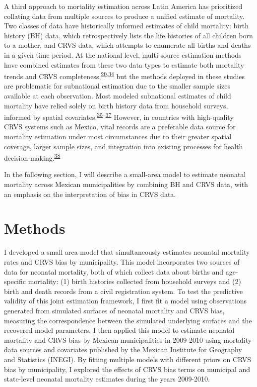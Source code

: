 \documentclass[
]{article}
\begin{document}
A third approach to mortality estimation across Latin America has prioritized collating data from multiple sources to produce a unified estimate of mortality. Two classes of data have historically informed estimates of child mortality: birth history (BH) data, which retrospectively lists the life histories of all children born to a mother, and CRVS data, which attempts to enumerate all births and deaths in a given time period. At the national level, multi-source estimation methods have combined estimates from these two data types to estimate both mortality trends and CRVS completeness,\textsuperscript{\protect\hyperlink{ref-Dicker2018}{20},\protect\hyperlink{ref-Fisker2019}{34}} but the methods deployed in these studies are problematic for subnational estimation due to the smaller sample sizes available at each observation. Most modeled subnational estimates of child mortality have relied solely on birth history data from household surveys, informed by spatial covariates.\textsuperscript{\protect\hyperlink{ref-Golding2017}{35}--\protect\hyperlink{ref-Wakefield2019}{37}} However, in countries with high-quality CRVS systems such as Mexico, vital records are a preferable data source for mortality estimation under most circumstances due to their greater spatial coverage, larger sample sizes, and integration into existing processes for health decision-making.\textsuperscript{\protect\hyperlink{ref-UnitedNationsStatisticsDivision2014}{38}}

In the following section, I will describe a small-area model to estimate neonatal mortality across Mexican municipalities by combining BH and CRVS data, with an emphasis on the interpretation of bias in CRVS data.

\hypertarget{methods}{%
\section{Methods}\label{methods}}

I developed a small area model that simultaneously estimates neonatal mortality rates and CRVS bias by municipality. This model incorporates two sources of data for neonatal mortality, both of which collect data about births and age-specific mortality: (1) birth histories collected from household surveys and (2) birth and death records from a civil registration system. To test the predictive validity of this joint estimation framework, I first fit a model using observations generated from simulated surfaces of neonatal mortality and CRVS bias, measuring the correspondence between the simulated underlying surfaces and the recovered model parameters. I then applied this model to estimate neonatal mortality and CRVS bias by Mexican municipalities in 2009-2010 using mortality data sources and covariates published by the Mexican Institute for Geography and Statistics (INEGI). By fitting multiple models with different priors on CRVS bias by municipality, I explored the effects of CRVS bias terms on municipal and state-level neonatal mortality estimates during the years 2009-2010.
\end{document}
